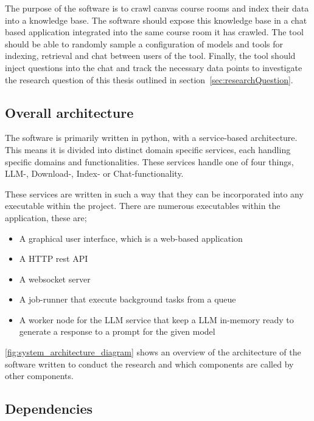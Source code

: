 The purpose of the software is to crawl canvas course rooms and index their data into a knowledge base. The software should expose this knowledge base in a chat based application integrated into the same course room it has crawled. The tool should be able to randomly sample a configuration of models and tools for indexing, retrieval and chat between users of the tool. Finally, the tool should inject questions into the chat and track the necessary data points to investigate the research question of this thesis outlined in section~\ref{sec:researchQuestion}.


\subsection{Overall architecture}


The software is primarily written in python, with a service-based architecture. This means it is divided into distinct domain specific services, each handling specific domains and functionalities. These services handle one of four things, \gls{LLM}-, Download-, Index- or Chat-functionality.


These services are written in such a way that they can be incorporated into any executable within the project. There are numerous executables within the application, these are;


\begin{itemize}
        \item A graphical user interface, which is a web-based application
        \item A HTTP rest API
        \item A websocket server
        \item A job-runner that execute background tasks from a queue
        \item A worker node for the \gls{LLM} service that keep a \gls{LLM} in-memory ready to generate a response to a prompt for the given model
\end{itemize}


\autoref{fig:system_architecture_diagram} shows an overview of the architecture of the software written to conduct the research and which components are called by other components.





\subsection{Dependencies}


